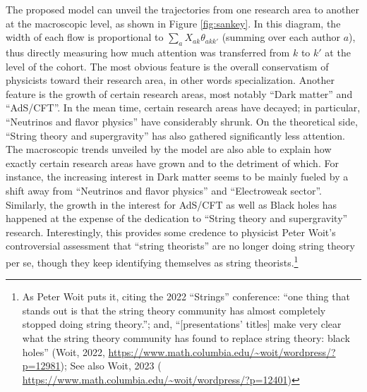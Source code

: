\documentclass{article}
\begin{document}
The proposed model can unveil the trajectories from one research area to another at the macroscopic level, as shown in Figure \ref{fig:sankey}. In this diagram, the width of each flow is proportional to $\sum_a X_{ak}\theta_{akk'}$ (summing over each author $a$), thus directly measuring how much attention was transferred from $k$ to $k'$ at the level of the cohort. The most obvious feature is the overall conservatism of physicists toward their research area, in other words specialization. Another feature is the growth of certain research areas, most notably ``Dark matter'' and ``AdS/CFT''. In the mean time, certain research areas have decayed; in particular, ``Neutrinos and flavor physics'' have considerably shrunk. %
On the theoretical side, ``String theory and supergravity'' has also gathered significantly less attention. The macroscopic trends unveiled by the model are also able to explain how exactly certain research areas have grown and to the detriment of which. For instance, the increasing interest in Dark matter seems to be mainly fueled by a shift away from ``Neutrinos and flavor physics'' and ``Electroweak sector''. Similarly, the growth in the interest for AdS/CFT as well as Black holes has happened at the expense of the dedication to ``String theory and supergravity'' research. Interestingly, this provides some credence to physicist Peter Woit's controversial assessment that ``string theorists'' are no longer doing string theory per se, though they keep identifying themselves as string theorists.\footnote{As Peter Woit puts it, citing the 2022 ``Strings'' conference: ``one thing that stands out is that the string theory community has almost completely stopped doing string theory.''; and, ``[presentations' titles] make very clear what the string theory community has found to replace string theory: black holes'' (Woit, 2022, \url{https://www.math.columbia.edu/~woit/wordpress/?p=12981}); See also Woit, 2023 ( \url{https://www.math.columbia.edu/~woit/wordpress/?p=12401})}
\end{document}
